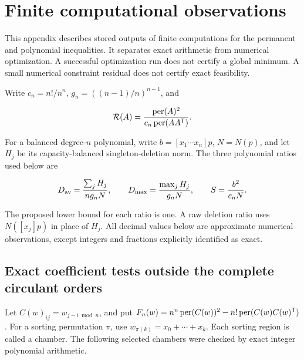 \section{Finite computational observations}\label{app:finite-observations}

This appendix describes stored outputs of finite computations for the permanent and polynomial inequalities. It separates exact arithmetic from numerical optimization. A successful optimization run does not certify a global minimum. A small numerical constraint residual does not certify exact feasibility.

Write \(c_n=n!/n^n\), \(g_n=((n-1)/n)^{n-1}\), and

\[
\mathcal R(A)=\frac{\operatorname{per}(A)^2}{c_n\operatorname{per}(AA^{\mathsf{T}})}.
\]

For a balanced degree-\(n\) polynomial, write \(b=[x_1\cdots x_n]p\), \(N=N(p)\), and let \(H_j\) be its capacity-balanced singleton-deletion norm. The three polynomial ratios used below are

\[
D_{\rm av}=\frac{\sum_jH_j}{ng_nN},\qquad
D_{\max}=\frac{\max_jH_j}{g_nN},\qquad
S=\frac{b^2}{c_nN}.
\]

The proposed lower bound for each ratio is one. A raw deletion ratio uses \(N([x_j]p)\) in place of \(H_j\). All decimal values below are approximate numerical observations, except integers and fractions explicitly identified as exact.

\subsection{Exact coefficient tests outside the complete circulant orders}\label{app:finite-1}

Let \(C(w)_{ij}=w_{j-i\bmod n}\), and put \(F_n(w)=n^n\operatorname{per}(C(w))^2-n!\operatorname{per}(C(w)C(w)^{\mathsf{T}})\). For a sorting permutation \(\pi\), use \(w_{\pi(k)}=x_0+\cdots+x_k\). Each sorting region is called a chamber. The following selected chambers were checked by exact integer polynomial arithmetic.

